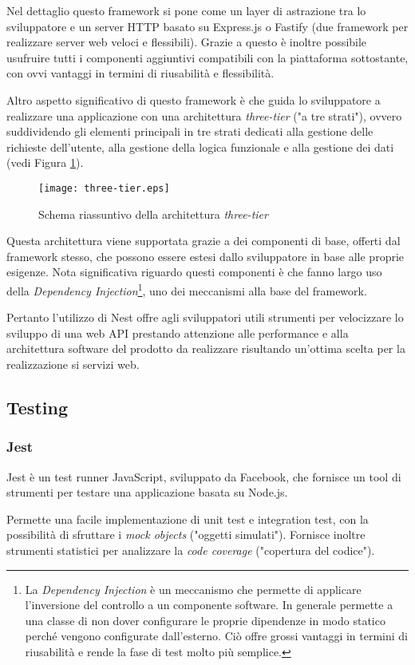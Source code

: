 Nel dettaglio questo framework si pone come un layer di astrazione tra lo sviluppatore e un server HTTP basato su Express.js o Fastify (due framework per realizzare
server web veloci e flessibili). Grazie a questo è inoltre possibile usufruire tutti i componenti aggiuntivi compatibili con la piattaforma sottostante, con ovvi
vantaggi in termini di riusabilità e flessibilità.

Altro aspetto significativo di questo framework è che guida lo sviluppatore a realizzare una applicazione con una architettura \textit{three-tier} ("a tre strati"),
ovvero suddividendo gli elementi principali in tre strati dedicati alla gestione delle richieste dell'utente, alla gestione della logica funzionale e alla gestione dei dati (vedi Figura \ref{fig:three-tier}).

\begin{figure}[ht]
    \centering
    \texttt{[image: three-tier.eps]}
    \caption{Schema riassuntivo della architettura \textit{three-tier}}
    \label{fig:three-tier}
\end{figure}

Questa architettura viene supportata grazie a dei componenti di base, offerti dal framework stesso, che possono
essere estesi dallo sviluppatore in base alle proprie esigenze.
Nota significativa riguardo questi componenti è che fanno largo uso della
\textit{Dependency Injection}\footnote{
    La \textit{Dependency Injection} è un meccanismo che permette di applicare
    l'inversione del controllo a un componente software. In generale permette a una classe di non dover configurare
    le proprie dipendenze in modo statico perché vengono configurate dall'esterno. Ciò offre grossi vantaggi in termini di riusabilità e rende la fase di test molto più semplice.},
uno dei meccanismi alla base del framework.

Pertanto l'utilizzo di Nest offre agli sviluppatori utili strumenti per velocizzare lo sviluppo di una web API prestando attenzione
alle performance e alla architettura software del prodotto da realizzare risultando un'ottima scelta per la realizzazione si servizi web.

\subsection{Testing}
\subsubsection{Jest}
Jest\cite{Jest} è un test runner JavaScript, sviluppato da Facebook, che fornisce un tool di strumenti per testare una applicazione basata su Node.js.

Permette una facile implementazione di unit test e integration test, con la possibilità di
sfruttare i \textit{mock objects} ("oggetti simulati"). Fornisce inoltre strumenti statistici per analizzare
la \textit{code coverage} ("copertura del codice").


